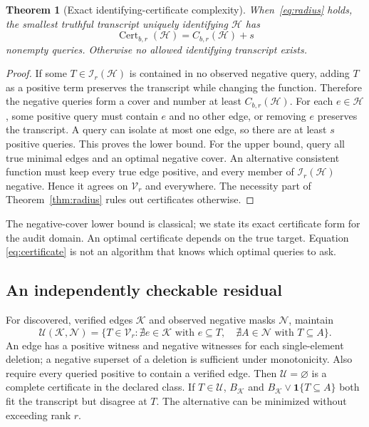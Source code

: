 \documentclass[10pt]{article}
\newtheorem{theorem}{Theorem}
\theoremstyle{definition}\newtheorem{definition}[theorem]{Definition}
\newcommand{\HH}{\mathcal H}
\newcommand{\KK}{\mathcal K}
\newcommand{\NN}{\mathcal N}
\newcommand{\UU}{\mathcal U}
\newcommand{\VV}{\mathcal V}
\newcommand{\II}{\mathcal I}
\newcommand{\ind}{\mathbf 1}
\newcommand{\Cert}{\operatorname{Cert}}
\begin{document}
\begin{theorem}[Exact identifying-certificate complexity]\label{thm:certificate}
When~\eqref{eq:radius} holds, the smallest truthful transcript uniquely identifying
$\HH$ has
\begin{equation}
 \Cert_{b,r}(\HH)=C_{b,r}(\HH)+s
 \label{eq:certificate}
\end{equation}
nonempty queries. Otherwise no allowed identifying transcript exists.
\end{theorem}
\begin{proof}
If some $T\in\II_r(\HH)$ is contained in no observed negative query, adding $T$ as a
positive term preserves the transcript while changing the function. Therefore the
negative queries form a cover and number at least $C_{b,r}(\HH)$. For each $e\in\HH$,
some positive query must contain $e$ and no other edge, or removing $e$ preserves
the transcript. A query can isolate at most one edge, so there are at least $s$
positive queries. This proves the lower bound.
For the upper bound, query all true minimal edges and an optimal negative cover.
An alternative consistent function must keep every true edge positive, and every
member of $\II_r(\HH)$ negative. Hence it agrees on $\VV_r$ and everywhere.
The necessity part of Theorem~\ref{thm:radius} rules out certificates otherwise.
\end{proof}
The negative-cover lower bound is classical; we state its exact certificate form
for the audit domain. An optimal certificate depends on the true target. Equation~
\eqref{eq:certificate} is not an algorithm that knows which optimal queries to ask.

\subsection{An independently checkable residual}
For discovered, verified edges $\KK$ and observed negative masks $\NN$, maintain
\begin{equation}
 \UU(\KK,\NN)=\{T\in\VV_r:
       \nexists e\in\KK\text{ with }e\subseteq T,\quad
       \nexists A\in\NN\text{ with }T\subseteq A\}.
 \label{eq:residual}
\end{equation}
An edge has a positive witness and negative witnesses for each single-element
deletion; a negative superset of a deletion is sufficient under monotonicity.
Also require every queried positive to contain a verified edge. Then $\UU=\varnothing$
is a complete certificate in the declared class. If $T\in\UU$, $B_{\KK}$ and
$B_{\KK}\vee\ind\{T\subseteq A\}$ both fit the transcript but disagree at $T$.
The alternative can be minimized without exceeding rank $r$.
\end{document}
